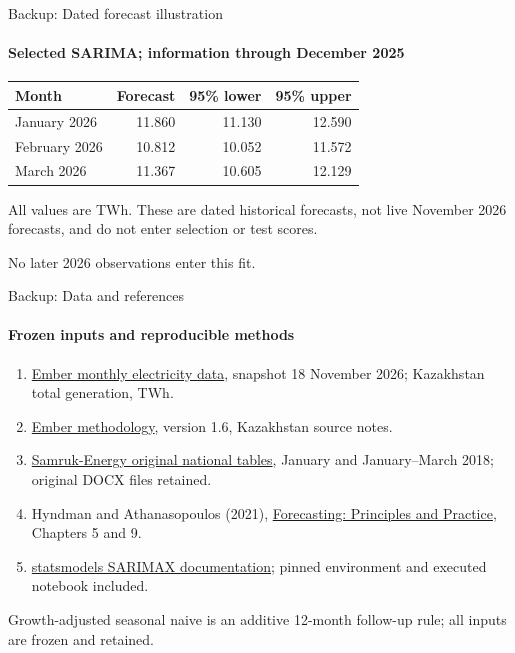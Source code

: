 \documentclass[aspectratio=169,10pt]{beamer}
\newcommand{\Source}[1]{\par\vfill{\fontsize{6.5}{7.5}\selectfont\color{black!65}#1\par}}
\begin{document}
\begin{frame}[t]{Backup: Dated forecast illustration}
\framesubtitle{Selected SARIMA; information through December 2025}
\begin{center}
\begin{tabular}{lrrr}\toprule
Month & Forecast & 95\% lower & 95\% upper\\\midrule
January 2026 & 11.860 & 11.130 & 12.590\\
February 2026 & 10.812 & 10.052 & 11.572\\
March 2026 & 11.367 & 10.605 & 12.129\\\bottomrule
\end{tabular}
\end{center}
All values are TWh. These are dated historical forecasts, not live November 2026 forecasts, and do not enter selection or test scores.
\Source{No later 2026 observations enter this fit.}
\end{frame}

\begin{frame}[t]{Backup: Data and references}
\framesubtitle{Frozen inputs and reproducible methods}
\small
\begin{enumerate}
\item \href{https://ember-energy.org/data/monthly-electricity-data/}{Ember monthly electricity data}, snapshot 18 November 2026; Kazakhstan total generation, TWh.
\item \href{https://files.ember-energy.org/public-downloads/ember_electricity_data_methodology.pdf}{Ember methodology}, version 1.6, Kazakhstan source notes.
\item \href{https://samruk-energy.kz/en/press-center/analytical-review}{Samruk-Energy original national tables}, January and January--March 2018; original DOCX files retained.
\item Hyndman and Athanasopoulos (2021), \href{https://otexts.com/fpp3/}{Forecasting: Principles and Practice}, Chapters 5 and 9.
\item \href{https://www.statsmodels.org/stable/generated/statsmodels.tsa.statespace.sarimax.SARIMAX.html}{statsmodels SARIMAX documentation}; pinned environment and executed notebook included.
\end{enumerate}
\Source{Growth-adjusted seasonal naive is an additive 12-month follow-up rule; all inputs are frozen and retained.}
\end{frame}
\end{document}
